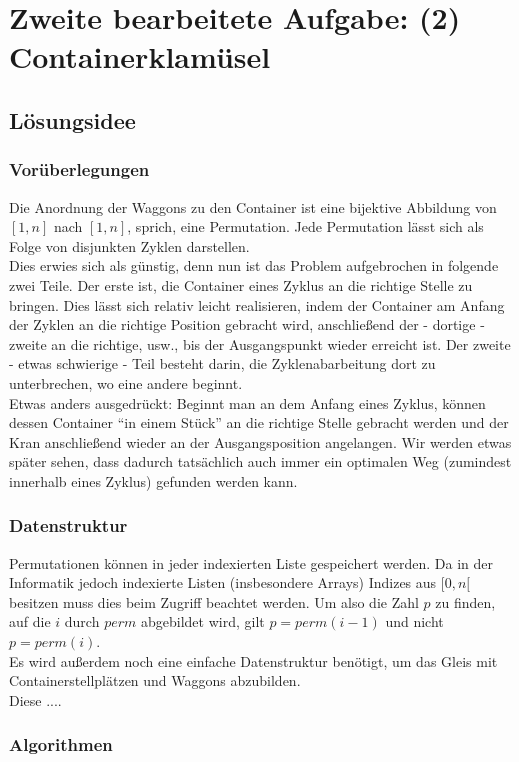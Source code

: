 \section{Zweite bearbeitete Aufgabe: (2) Containerklamüsel}
\subsection{Lösungsidee}
\subsubsection{Vorüberlegungen}
Die Anordnung der Waggons zu den Container ist eine bijektive Abbildung von $[1,n]$ nach $[1,n]$, sprich, eine Permutation.
Jede Permutation lässt sich als Folge von disjunkten Zyklen darstellen. \\ %
Dies erwies sich als günstig, denn nun ist das Problem aufgebrochen in folgende zwei Teile.
Der erste ist, die Container eines Zyklus an die richtige Stelle zu bringen.
Dies lässt sich relativ leicht realisieren, indem der Container am Anfang der Zyklen an die richtige Position gebracht wird, anschließend der - dortige - zweite an die richtige, usw., bis der Ausgangspunkt wieder erreicht ist.
Der zweite - etwas schwierige - Teil besteht darin, die Zyklenabarbeitung dort zu unterbrechen, wo eine andere beginnt. \\
Etwas anders ausgedrückt:
Beginnt man an dem Anfang eines Zyklus, können dessen Container ``in einem Stück'' an die richtige Stelle gebracht werden und der Kran anschließend wieder an der Ausgangsposition angelangen.
Wir werden etwas später sehen, dass dadurch tatsächlich auch immer ein optimalen Weg (zumindest innerhalb eines Zyklus) gefunden werden kann.
\subsubsection{Datenstruktur}
Permutationen können in jeder indexierten Liste gespeichert werden.
Da in der Informatik jedoch indexierte Listen (insbesondere Arrays) Indizes aus $[0,n[$ besitzen muss dies beim Zugriff beachtet werden.
Um also die Zahl $p$ zu finden, auf die $i$ durch $perm$ abgebildet wird, gilt $p = perm(i-1)$ und nicht $p = perm(i)$. \\
Es wird außerdem noch eine einfache Datenstruktur benötigt, um das Gleis mit Containerstellplätzen und Waggons abzubilden. \\
Diese ....
\subsubsection{Algorithmen}
